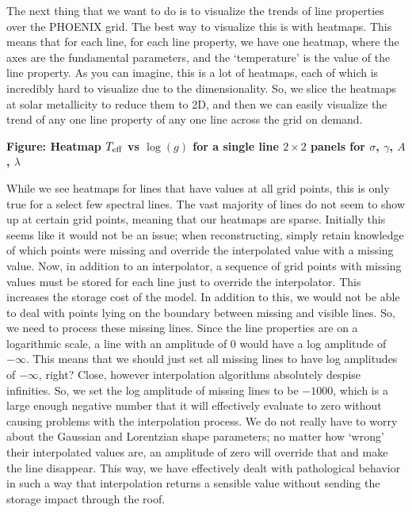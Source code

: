 \documentclass[twocolumn]{aastex631}
\def\Teff{T_{\rm eff}}
\def\logg{\log(g)}
\begin{document}
The next thing that we want to do is to visualize the trends of line properties over
the PHOENIX grid. The best way to visualize this is with heatmaps. This means that for
each line, for each line property, we have one heatmap, where the axes are the fundamental
parameters, and the `temperature' is the value of the line property. As you can imagine, this
is a lot of heatmaps, each of which is incredibly hard to visualize due to the dimensionality.
So, we slice the heatmaps at solar metallicity to reduce them to 2D, and then we can easily
visualize the trend of any one line property of any one line across the grid on demand.

\begin{mdframed}
    \textbf{Figure: Heatmap $\Teff$ vs $\logg$ for a single line $2\times2$ panels for $\sigma$, $\gamma$, $A$, $\lambda$ }
\end{mdframed}

While we see heatmaps for lines that have values at all grid points, this is only true for
a select few spectral lines. The vast majority of lines do not seem to show up at certain
grid points, meaning that our heatmaps are sparse. Initially this seems like it would not be an
issue; when reconstructing, simply retain knowledge of which points were missing and override
the interpolated value with a missing value. Now, in addition to an
interpolator, a sequence of grid points with missing values must be stored for each line just to
override the interpolator. This increases the storage cost of the model. In addition to this, we would
not be able to deal with points lying on the boundary between missing and visible lines. So, we need
to process these missing lines. Since the line properties are on a logarithmic scale,
a line with an amplitude of 0 would have a log amplitude of $-\infty$. This means that we should just
set all missing lines to have log amplitudes of $-\infty$, right? Close, however interpolation
algorithms absolutely despise infinities. So, we set the log amplitude of missing lines to be
$-1000$, which is a large enough negative number that it will effectively evaluate to zero without
causing problems with the interpolation process. We do not really have to worry about the Gaussian
and Lorentzian shape parameters; no matter how `wrong' their interpolated values are, an amplitude of
zero will override that and make the line disappear. This way, we have effectively dealt with
pathological behavior in such a way that interpolation returns a sensible value without sending
the storage impact through the roof.
\end{document}
